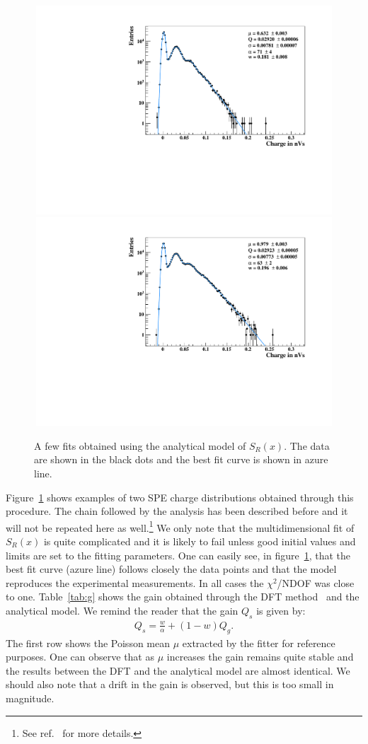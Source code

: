 \documentclass[a4paper,11pt]{article}
\begin{document}
\begin{figure}[!t]
\centering
\includegraphics[width=11.3cm, height=7.8cm]{figures/fit-1.pdf} \\[1.5ex]
\includegraphics[width=11.3cm, height=7.8cm]{figures/fit-3.pdf} %
\caption{A few fits obtained using the analytical model of $S_R(x)$.  The data are shown in the black dots and the best fit curve is shown in azure line. }
\label{fig:spe}
\end{figure}
Figure~\ref{fig:spe} shows examples of two SPE charge distributions obtained through this procedure. 
The chain followed by the analysis has been described before and it will not be repeated here as well.\footnote{See ref.~\cite{me2} for more details.} 
We only note that the multidimensional fit of $S_R(x)$ is quite complicated and it is likely to fail unless good initial values and limits are set to the fitting parameters.  
One can easily see, in figure~\ref{fig:spe}, that the best fit curve (azure line) follows closely the data points and that the model reproduces the experimental measurements. 
In all cases the $\chi^2$/NDOF was close to one. 
Table~\ref{tab:g} shows the gain obtained through the DFT method~\cite{me} and the analytical model. 
We remind the reader that the gain $Q_s$ is given by:
\begin{align}
Q_s  = \frac{w}{\alpha} + (1-w)Q_g. 
\end{align}
The first row shows the Poisson mean $\mu$ extracted by the fitter for reference purposes. 
One can observe that as $\mu$ increases the gain remains quite stable and the results between the DFT and the analytical model are almost identical. 
We should also note that a drift in the gain is observed, but this is too small in magnitude.   
\end{document}
